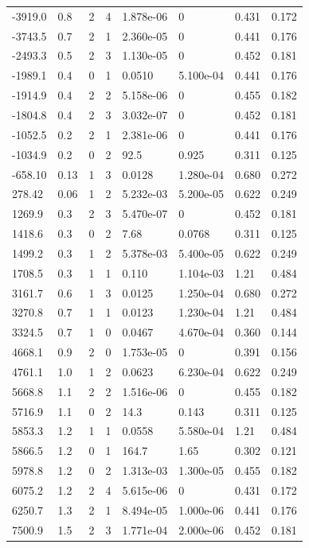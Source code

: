 \documentclass[preview]{standalone}
\begin{document}
{{\begin{tabular}{L{1.2cm}C{1.2cm} C{0.3cm}C{0.5cm} C{1.4cm}C{1.4cm} C{1.4cm}C{1.4cm}}
  -3919.0  &   0.8  & 2     &  4 &  1.878e-06  & 0  & 0.431 &  0.172   \\ 
  -3743.5  &   0.7  & 2     &  1 &  2.360e-05  & 0  & 0.441 &  0.176   \\ 
  -2493.3  &   0.5  & 2     &  3 &  1.130e-05  & 0  & 0.452 &  0.181   \\ 
  -1989.1  &   0.4  & 0     &  1 &  0.0510  & 5.100e-04  & 0.441 &  0.176   \\ 
  -1914.9  &   0.4  & 2     &  2 &  5.158e-06  & 0  & 0.455 &  0.182   \\ 
  -1804.8  &   0.4  & 2     &  3 &  3.032e-07  & 0  & 0.452 &  0.181   \\ 
  -1052.5  &   0.2  & 2     &  1 &  2.381e-06  & 0  & 0.441 &  0.176   \\ 
  -1034.9  &   0.2  & 0     &  2 &  92.5  & 0.925  & 0.311 &  0.125   \\ 
  -658.10  &  0.13  & 1     &  3 &  0.0128  & 1.280e-04  & 0.680 &  0.272   \\ 
  278.42  &  0.06  & 1     &  2 &  5.232e-03  & 5.200e-05  & 0.622 &  0.249   \\ 
  1269.9  &   0.3  & 2     &  3 &  5.470e-07  & 0  & 0.452 &  0.181   \\ 
  1418.6  &   0.3  & 0     &  2 &  7.68  & 0.0768  & 0.311 &  0.125   \\ 
  1499.2  &   0.3  & 1     &  2 &  5.378e-03  & 5.400e-05  & 0.622 &  0.249   \\ 
  1708.5  &   0.3  & 1     &  1 &  0.110  & 1.104e-03  & 1.21 &  0.484   \\ 
  3161.7  &   0.6  & 1     &  3 &  0.0125  & 1.250e-04  & 0.680 &  0.272   \\ 
  3270.8  &   0.7  & 1     &  1 &  0.0123  & 1.230e-04  & 1.21 &  0.484   \\ 
  3324.5  &   0.7  & 1     &  0 &  0.0467  & 4.670e-04  & 0.360 &  0.144   \\ 
  4668.1  &   0.9  & 2     &  0 &  1.753e-05  & 0  & 0.391 &  0.156   \\ 
  4761.1  &   1.0  & 1     &  2 &  0.0623  & 6.230e-04  & 0.622 &  0.249   \\ 
  5668.8  &   1.1  & 2     &  2 &  1.516e-06  & 0  & 0.455 &  0.182   \\ 
  5716.9  &   1.1  & 0     &  2 &  14.3  & 0.143  & 0.311 &  0.125   \\ 
  5853.3  &   1.2  & 1     &  1 &  0.0558  & 5.580e-04  & 1.21 &  0.484   \\ 
  5866.5  &   1.2  & 0     &  1 &  164.7  & 1.65  & 0.302 &  0.121   \\ 
  5978.8  &   1.2  & 0     &  2 &  1.313e-03  & 1.300e-05  & 0.455 &  0.182   \\ 
  6075.2  &   1.2  & 2     &  4 &  5.615e-06  & 0  & 0.431 &  0.172   \\ 
  6250.7  &   1.3  & 2     &  1 &  8.494e-05  & 1.000e-06  & 0.441 &  0.176   \\ 
  7500.9  &   1.5  & 2     &  3 &  1.771e-04  & 2.000e-06  & 0.452 &  0.181   \\ 
\hline 
\end{tabular} 

}}
\end{document}
